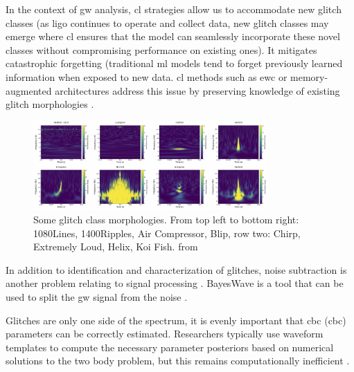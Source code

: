 In the context of \acrshort{gw} analysis, \acrshort{cl} strategies allow us to accommodate new glitch classes (as \acrshort{ligo} continues to operate and collect data, new glitch classes may emerge where \acrshort{cl} ensures that the model can seamlessly incorporate these novel classes without compromising performance on existing ones). It mitigates catastrophic forgetting (traditional \acrshort{ml} models tend to forget previously learned information when exposed to new data. \acrshort{cl} methods such as \acrfull{ewc} or memory-augmented architectures address this issue by preserving knowledge of existing glitch morphologies \citep{abbott2023open, kirkpatrick2017overcoming}.  

\begin{figure}[H]
    \centering
    \includegraphics[width=0.8\textwidth]{Images/glitch_morphologies.jpg}
    \caption{Some glitch class morphologies. From top left to bottom right: 1080Lines, 1400Ripples, Air Compressor, Blip, row two: Chirp, Extremely Loud, Helix, Koi Fish. from \citep{glanzer2023data}}
    \label{fig:glitch_morphologies}
\end{figure}

In addition to identification and characterization of glitches, noise subtraction is another problem relating to signal processing \citep{benedetto2023ai, ormiston2020noise, davis2022detector, cornish2021bayeswave}. BayesWave is a tool that can be used to split the \acrshort{gw} signal from the noise \citep{cornish2021bayeswave}.

Glitches are only one side of the spectrum, it is evenly important that \acrlong{cbc} (\acrshort{cbc}) parameters can be correctly estimated. Researchers typically use waveform templates to compute the necessary parameter posteriors based on numerical solutions to the two body problem, but this remains computationally inefficient \citep{ajith2011addressing,coogan2022efficient,isoyama2020post}.

